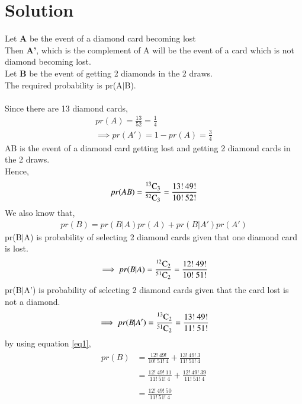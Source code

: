 \documentclass[journal,12pt,twocolumn]{IEEEtran}
\begin{document}
\section{Solution}
Let \textbf{A} be the event of a diamond card becoming lost\\
Then \textbf{A'}, which is the complement of A will be the event of a card which is not diamond becoming lost.\\
Let \textbf{B} be the event of getting 2 diamonds in the 2 draws.\\
The required probability is pr(A$|$B).\\
\\Since there are 13 diamond cards,
\begin{align}
    pr(A)=\frac{13}{52}=\frac{1}{4}\\
    \implies pr(A')=1-pr(A)=\frac{3}{4}
\end{align}
AB is the event of a diamond card getting lost and getting 2 diamond cards in the 2 draws.\\
Hence,
\begin{align}
    pr(AB)=\frac{{}^{13}\mathrm{C}_{3}}{{}^{52}\mathrm{C}_{3}}=\frac{13!\:49!}{10!\:52!}
\end{align}
We also know that,
\begin{align}
    pr(B)=pr(B \vert A)pr(A)+pr(B \vert A')pr(A') \label{eq1}
\end{align}
 pr(B$|$A) is probability of selecting 2 diamond cards given that one diamond card is lost.
\begin{align}
   \implies pr(B \vert A)=\frac{{}^{12}\mathrm{C}_{2}}{{}^{51}\mathrm{C}_{2}}=\frac{12!\:49!}{10!\:51!}
\end{align}
pr(B$|$A') is probability of selecting 2 diamond cards given that the card lost is not a diamond.
\begin{align}
    \implies pr(B \vert A')=\frac{{}^{13}\mathrm{C}_{2}}{{}^{51}\mathrm{C}_{2}}=\frac{13!\:49!}{11!\:51!}
\end{align}
by using equation \eqref{eq1},
\begin{align}
\begin{split}
    pr(B)&=\frac{12!\:49!}{10!\:51!\:4}+\frac{13!\:49!\:3}{11!\:51!\:4}\\\\
         &=\frac{12!\:49!\:11}{11!\:51!\:4}+\frac{12!\:49!\:39}{11!\:51!\:4}\\\\
         &=\frac{12!\:49!\:50}{11!\:51!\:4}
\end{split}
\end{align}
\end{document}
